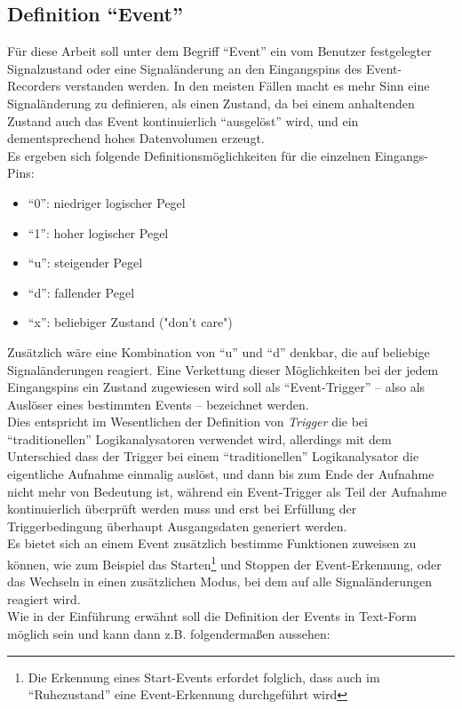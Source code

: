 \subsection{Definition ``Event''}

Für diese Arbeit soll unter dem Begriff ``Event'' ein vom Benutzer festgelegter Signalzustand oder eine Signaländerung an den Eingangspins des Event-Recorders verstanden werden. In den meisten Fällen macht es mehr Sinn eine Signaländerung zu definieren, als einen Zustand, da bei einem anhaltenden Zustand auch das Event kontinuierlich ``ausgelöst'' wird, und ein dementsprechend hohes Datenvolumen erzeugt.\\
Es ergeben sich folgende Definitionsmöglichkeiten für die einzelnen Eingangs-Pins:
\begin{itemize}
	\item ``0'': niedriger logischer Pegel
	\item ``1'': hoher logischer Pegel
	\item ``u'': steigender Pegel
	\item ``d'': fallender Pegel
	\item ``x'': beliebiger Zustand ("don't care") 
\end{itemize}
Zusätzlich wäre eine Kombination von ``u'' und ``d'' denkbar, die auf beliebige Signaländerungen reagiert.
Eine Verkettung dieser Möglichkeiten bei der jedem Eingangspins ein Zustand zugewiesen wird soll als ``Event-Trigger'' -- also als Auslöser eines bestimmten Events -- bezeichnet werden.\\
Dies entspricht im Wesentlichen der Definition von \textit{Trigger} die bei ``traditionellen'' Logikanalysatoren verwendet wird, allerdings mit dem Unterschied dass der Trigger bei einem ``traditionellen'' Logikanalysator die eigentliche Aufnahme einmalig auslöst, und dann bis zum Ende der Aufnahme nicht mehr von Bedeutung ist, während ein Event-Trigger als Teil der Aufnahme kontinuierlich überprüft werden muss und erst bei Erfüllung der Triggerbedingung überhaupt Ausgangsdaten generiert werden.\\
Es bietet sich an einem Event zusätzlich bestimme Funktionen zuweisen zu können, wie zum Beispiel das Starten\footnote{Die Erkennung eines Start-Events erfordet folglich, dass auch im ``Ruhezustand'' eine Event-Erkennung durchgeführt wird} und Stoppen der Event-Erkennung, oder das Wechseln in einen zusätzlichen Modus, bei dem auf alle Signaländerungen reagiert wird.\\
Wie in der Einführung erwähnt soll die Definition der Events in Text-Form möglich sein und kann dann z.B. folgendermaßen aussehen:

